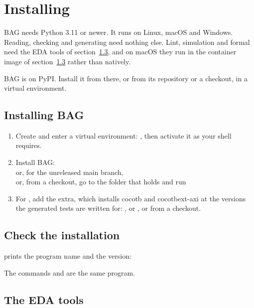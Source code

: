 \chapter{Installing}
\label{ch:install}

BAG needs Python 3.11 or newer. It runs on Linux, macOS and Windows. Reading, checking
and generating need nothing else. Lint, simulation and formal need the EDA tools of
section~\ref{sec:eda}, and on macOS they run in the container image of
section~\ref{sec:eda} rather than natively.

BAG is on PyPI. Install it from there, or from its repository or a checkout, in a
virtual environment.

\section{Installing BAG}

\begin{enumerate}
\item Create and enter a virtual environment: , then
  activate it as your shell requires.
\item Install BAG: \\
  or, for the unreleased main branch,
  \\
  or, from a checkout, go to the folder that holds  and run
\item For , add the  extra, which installs cocotb and
  cocotbext-axi at the versions the generated tests are written for:
  , or
  ,
  or  from a checkout.
\end{enumerate}

\section{Check the installation}

 prints the program name and the version:



The commands  and  are the same program.

\section{The EDA tools}
\label{sec:eda}

